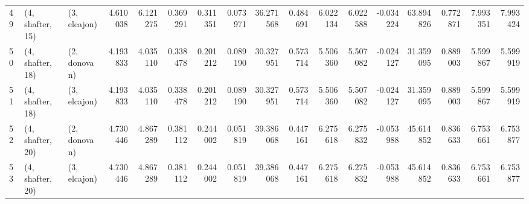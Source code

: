 \begin{tabular}{lllrrrrrrrrrrrrrr}
49 &  (4, shafter, 15) &     (3, elcajon) &  4.610038 &  6.121275 &   0.369291 &  0.311351 &  0.073971 &   36.271568 &  0.484691 &   6.022134 &   6.022588 & -0.034224 &   63.894826 &  0.772871 &   7.993351 &   7.993424 \\
50 &  (4, shafter, 18) &     (2, donovan) &  4.193833 &  4.035110 &   0.338478 &  0.201212 &  0.089190 &   30.327951 &  0.573714 &   5.506360 &   5.507082 & -0.024127 &   31.359095 &  0.889003 &   5.599867 &   5.599919 \\
51 &  (4, shafter, 18) &     (3, elcajon) &  4.193833 &  4.035110 &   0.338478 &  0.201212 &  0.089190 &   30.327951 &  0.573714 &   5.506360 &   5.507082 & -0.024127 &   31.359095 &  0.889003 &   5.599867 &   5.599919 \\
52 &  (4, shafter, 20) &     (2, donovan) &  4.730446 &  4.867289 &   0.381112 &  0.244002 &  0.051819 &   39.386068 &  0.447161 &   6.275618 &   6.275832 & -0.053988 &   45.614852 &  0.836633 &   6.753661 &   6.753877 \\
53 &  (4, shafter, 20) &     (3, elcajon) &  4.730446 &  4.867289 &   0.381112 &  0.244002 &  0.051819 &   39.386068 &  0.447161 &   6.275618 &   6.275832 & -0.053988 &   45.614852 &  0.836633 &   6.753661 &   6.753877 \\
\bottomrule
\end{tabular}
